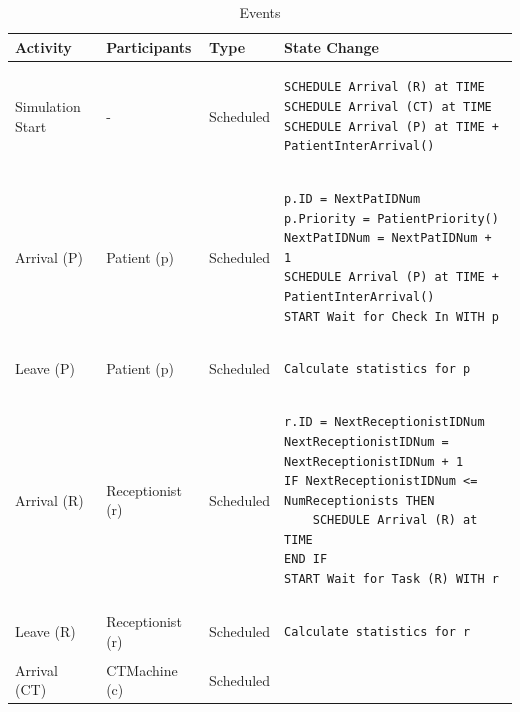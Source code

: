 \documentclass[
  10pt,
  a4paperpaper,
  DIV=11,
  numbers=noendperiod,
  oneside]{scrreprt}
\begin{document}
\begin{longtable}{@{}>{\raggedright\arraybackslash}p{1.5cm}>{\raggedright\arraybackslash}p{2.1cm}>{\raggedright\arraybackslash}p{2.2cm}>{\raggedright\arraybackslash}p{10cm}@{}}

\caption{\label{tbl-events_lab1}Events}

\tabularnewline

  \toprule
  Activity          & Participants & Type       & State Change \\ \midrule
  \endhead
  Simulation Start & -  & Scheduled  & 
  \vspace{-12pt}
  \begin{lstlisting}[language=CMPseudo]
SCHEDULE Arrival (R) at TIME
SCHEDULE Arrival (CT) at TIME
SCHEDULE Arrival (P) at TIME + PatientInterArrival()
  \end{lstlisting}
  \\ \midrule
  Arrival (P) & Patient (p)  & Scheduled  & 
  \vspace{-12pt}
  \begin{lstlisting}[language=CMPseudo]
p.ID = NextPatIDNum
p.Priority = PatientPriority()
NextPatIDNum = NextPatIDNum + 1
SCHEDULE Arrival (P) at TIME + PatientInterArrival()
START Wait for Check In WITH p
  \end{lstlisting}
  \\ \midrule
  Leave (P) & Patient (p)  & Scheduled  & 
  \vspace{-12pt}
  \begin{lstlisting}[language=CMPseudo]
Calculate statistics for p
  \end{lstlisting}
  \\ \midrule
  Arrival (R) & Receptionist (r)  & Scheduled  & 
  \vspace{-12pt}
  \begin{lstlisting}[language=CMPseudo]
r.ID = NextReceptionistIDNum
NextReceptionistIDNum = NextReceptionistIDNum + 1
IF NextReceptionistIDNum <= NumReceptionists THEN
    SCHEDULE Arrival (R) at TIME
END IF
START Wait for Task (R) WITH r
  \end{lstlisting}
  \\ \midrule
  Leave (R) & Receptionist (r)  & Scheduled  & 
  \vspace{-12pt}
  \begin{lstlisting}[language=CMPseudo]
Calculate statistics for r
  \end{lstlisting}
  \\ \midrule
  Arrival (CT) & CTMachine (c)  & Scheduled  & 
  \vspace{-12pt}

\end{longtable}
\end{document}
